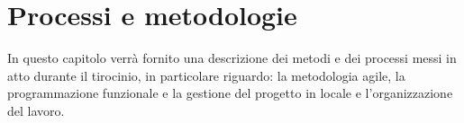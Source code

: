 
\chapter{Processi e metodologie}
\label{cap:processi-metodologie}

In questo capitolo verrà fornito una descrizione dei metodi e dei processi messi in atto durante il tirocinio, in particolare riguardo: la metodologia agile, la programmazione funzionale e la gestione del progetto in locale e l'organizzazione del lavoro.

